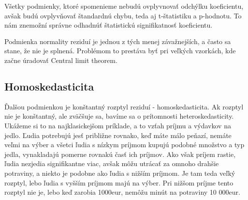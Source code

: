 Všetky podmienky, ktoré spomenieme nebudú ovplyvnovať odchýlku
koeficientu, avšak budú ovplyvňovať štandardnú chybu, teda aj
t-štatistiku a p-hodnotu. To nám znemožní správne odhadnúť štatistickú
signifikatnosť koeficientu.

Podmienka normality reziduí je jednou z tých menej závažnejších, a často
sa stane, že nie je splnená. Problémom to prestáva byť pri veľkých
vzorkách, kde začne úradovať Central limit theorem.

\hypertarget{homoskedasticita}{%
\subsection{Homoskedasticita}\label{homoskedasticita}}

Ďalšou podmienkou je konštantný rozptyl reziduí - homoskedasticita. Ak
rozptyl nie je konštantný, ale zväčšuje sa, bavíme sa o prítomnosti
heteroskedasticity. Ukážeme si to na najklasickejšom príklade, a to
vzťah príjmu a výdavkov na jedlo. Ľudia potrebujú jesť približne
rovnako, keď máte málo peňazí, nemáte veľmi na výber a všetci ľudia s
nízkym príjmom kupujú podobné množstvo a typ jedla, vynakladajú pomerne
rovnakú časť ich príjmov. Ako však príjem rastie, ľudia nezjedia
signifikantne viac, avšak môžu utrácať za omnoho drahšie potraviny, a
niekto je podobne ako ľudia s nižším príjmom. Je tam teda veľký rozptyl,
lebo ľudia s vyšším príjmom majú na výber. Pri nižšom príjme tento
rozptyl nie je, lebo keď zarobia 1000eur, nemôžu minút na potraviny 10
000eur.

\begin{Shaded}
\begin{Highlighting}[]
\StringTok{ }\OperatorTok{:}
\StringTok{ }\NormalTok{(} \NormalTok{, }  \OperatorTok{*}\StringTok{ }
\StringTok{ }\OperatorTok{~}\StringTok{ }

\NormalTok{(} \NormalTok{, } \NormalTok{,}
      \NormalTok{)}

 \NormalTok{)}
\end{Highlighting}
\end{Shaded}

